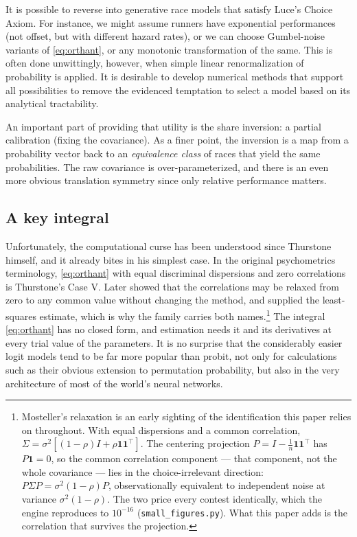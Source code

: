 \documentclass[11pt]{article}
\begin{document}
It is possible to reverse into generative race models that satisfy Luce's Choice Axiom. For instance, we might assume runners have exponential performances (not offset, but with different hazard rates), or we can choose Gumbel-noise variants of \eqref{eq:orthant}, or any monotonic transformation of the same. This is often done unwittingly, however, when simple linear renormalization of probability is applied. It is desirable to develop numerical methods that support all possibilities to remove the evidenced temptation to select a model based on its analytical tractability.

An important part of providing that utility is the share inversion: a partial calibration (fixing the covariance). As a finer point, the inversion is a map from a probability vector back to an {\em equivalence class} of races that yield the same probabilities. The raw covariance is over-parameterized, and there is an even more obvious translation symmetry since only relative performance matters.


\subsection{A key integral}

Unfortunately, the computational curse has been understood since Thurstone himself,
and it already bites in his simplest case. In the original psychometrics
terminology, \eqref{eq:orthant} with equal discriminal dispersions and
zero correlations is Thurstone's Case V. Later \citet{mosteller1951} showed
that the correlations may be relaxed from zero to any common value without
changing the method, and supplied the least-squares estimate,
which is why the family carries both names.\footnote{Mosteller's
relaxation is an early sighting of the identification this paper relies
on throughout. With equal dispersions and a common correlation,
$\Sigma=\sigma^2[(1-\rho)I+\rho\mathbf{1}\mathbf{1}^{\top}]$. The
centering projection $P=I-\tfrac1n\mathbf{1}\mathbf{1}^{\top}$ has
$P\mathbf{1}=0$, so the common correlation component --- that component, not
the whole covariance --- lies in the choice-irrelevant direction:
$P\Sigma P=\sigma^2(1-\rho)P$, observationally equivalent to independent
noise at variance $\sigma^2(1-\rho)$. The two price every contest
identically, which the engine reproduces to $10^{-16}$ (\texttt{small\_figures.py}). What this
paper adds is the correlation that survives the projection.} The integral \eqref{eq:orthant} has no closed form, and estimation
needs it and its derivatives at every trial value of the parameters. It is no surprise that the considerably easier logit models tend to be far more popular than probit, not only for calculations such as their obvious extension to permutation probability, but also in the very architecture of most of the world's neural networks.
\end{document}
